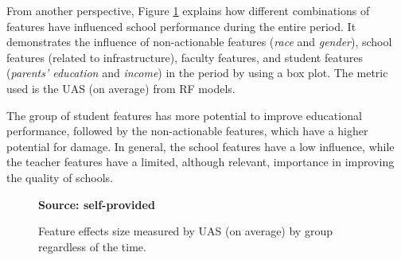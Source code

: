 From another perspective, Figure \ref{fig:groups_variable} explains how different combinations of features have influenced school performance during the entire period. It demonstrates the influence of non-actionable features (\textit{race} and \textit{gender}), school features (related to infrastructure), faculty features, and student features (\textit{parents’ education} and \textit{income}) in the period by using a box plot. The metric used is the \gls{UAS} (on average) from \gls{RF} models. 

The group of student features has more potential to improve educational performance, followed by the non-actionable features, which have a higher potential for damage. In general, the school features have a low influence, while the teacher features have a limited, although relevant, importance in improving the quality of schools. 

\begin{figure}[ht!]
\centering
\caption{\textmd{Feature effects size measured by UAS (on average) by group regardless of the time.}}
\label{fig:groups_variable}
\par\medskip\ABNTEXfontereduzida\selectfont\textbf{Source: self-provided}  
\par\medskip
\end{figure}
